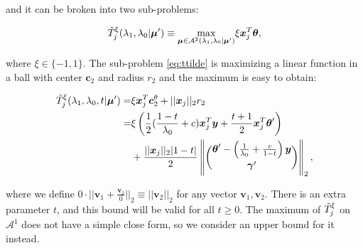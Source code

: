 and it can be broken into two sub-problems:

\begin{equation}
    \label{eq:ttilde}
    \Tilde{T}^\xi_j(\lambda_1,\lambda_0|\boldsymbol\mu')\equiv\underset{\boldsymbol\mu\in\mathcal{A}^2(\lambda_1,\lambda_0|\boldsymbol\mu')}{\mathrm{max}}\xi \boldsymbol x_j^T\boldsymbol\theta,
\end{equation}

where $\xi\in\{-1,1\}$. The sub-problem \eqref{eq:ttilde} is maximizing a linear function in a ball with center $\boldsymbol c_2$ and radius $r_2$ and the maximum is easy to obtain:

\begin{gather}
    \label{eq:ttildexi}
    \begin{aligned}
        \Tilde{T}^\xi_j(\lambda_1,\lambda_0,t|\boldsymbol\mu')=&\xi\boldsymbol x_j^T\boldsymbol c_2^\theta+||\boldsymbol x_j||_2r_2\\
        =&\xi\left( \frac{1}{2}(\frac{1-t}{\lambda_0}+c)\boldsymbol x_j^T\boldsymbol y+\frac{t+1}{2}\boldsymbol x_j^T\boldsymbol\theta'\right)\\
        &+\frac{||\boldsymbol x_j||_2|1-t|}{2}\left\Vert\binom{\boldsymbol\theta'-\left(\frac{1}{\lambda_0}+\frac{c}{1-t}\right)\boldsymbol y}{\boldsymbol\gamma'}\right\Vert_2,\\
    \end{aligned}
\end{gather}

where we define $0\cdot||\boldsymbol v_1+\frac{\boldsymbol v_2}{0}||_2\equiv ||\boldsymbol v_2||_2$ for any vector $\boldsymbol v_1,\boldsymbol v_2$. There is an extra parameter $t$, and this bound will be valid for all $t\geq 0$. The maximum of $\Tilde{T}^\xi_j$ on $\mathcal{A}^1$ does not have a simple close form, so we consider an upper bound for it instead.

